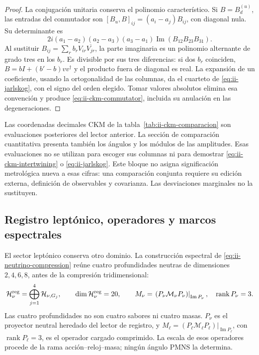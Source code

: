\begin{proof}
La conjugación unitaria conserva el polinomio característico. Si
\(B=B_d^{(u)}\), las entradas del conmutador son
\([B_u,B]_{ij}=(a_i-a_j)B_{ij}\), con diagonal nula. Su determinante es
\[
 2i(a_1-a_2)(a_2-a_3)(a_3-a_1)
     \operatorname{Im}(B_{12}B_{23}B_{31}).
\]
Al sustituir \(B_{ij}=\sum_r b_rV_{ir}\overline{V_{jr}}\), la parte
imaginaria es un polinomio alternante de grado tres en los \(b_r\).
Es divisible por sus tres diferencias: si dos \(b_r\) coinciden,
\(B=bI+(b'-b)vv^\dagger\) y el producto fuera de diagonal es real.
La expansión de un coeficiente, usando la ortogonalidad de las columnas,
da el cuarteto de \eqref{eq:ii-jarlskog}, con el signo del orden elegido.
Tomar valores absolutos elimina esa convención y produce
\eqref{eq:ii-ckm-commutator}, incluida su anulación en las degeneraciones.
\end{proof}

\begin{remark}
Las coordenadas decimales CKM de la
tabla~\ref{tab:ii-ckm-comparacion} son evaluaciones posteriores del
lector anterior. La sección de comparación cuantitativa presenta también
los ángulos y los módulos de las amplitudes. Esas evaluaciones no se
utilizan para escoger sus columnas ni para demostrar
\eqref{eq:ii-ckm-intertwining} o \eqref{eq:ii-jarlskog}.
Este bloque no asigna significación metrológica nueva a esas cifras:
una comparación conjunta requiere su edición externa, definición de
observables y covarianza. Las desviaciones marginales no la sustituyen.
\end{remark}

\subsection{Registro leptónico, operadores y marcos espectrales}

El sector leptónico conserva otro dominio. La construcción espectral de
\eqref{eq:ii-neutrino-compression} reúne cuatro profundidades neutras de dimensiones
\(2,4,6,8\), antes de la compresión tridimensional:
\begin{equation}
 \mathcal H_\nu^{\rm reg}
 =\bigoplus_{j=1}^{4}\mathcal H_{\nu,G_j},\qquad
 \dim\mathcal H_\nu^{\rm reg}=20,\qquad
 M_\nu=\left.(P_\nu\mathcal M_\nu P_\nu)\right|_{\operatorname{Im}P_\nu},
 \quad\operatorname{rank}P_\nu=3.
 \label{eq:ii-neutrino-compression}
\end{equation}
Las cuatro profundidades no son cuatro sabores ni cuatro masas.
\(P_\nu\) es el proyector neutral heredado del lector de registro, y
\(M_\ell=\left.(P_\ell\mathcal M_\ell P_\ell)\right|_{\operatorname{Im}P_\ell}\),
con \(\operatorname{rank}P_\ell=3\), es el operador cargado comprimido.
La escala de esos operadores procede de la rama acción--reloj--masa;
ningún ángulo PMNS la determina.

